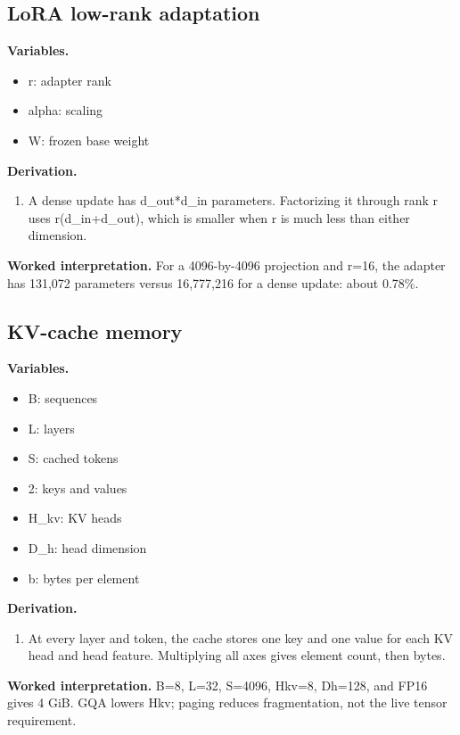 \subsection{LoRA low-rank adaptation}
\textbf{Variables.}\begin{itemize}
\item r: adapter rank
\item alpha: scaling
\item W: frozen base weight
\end{itemize}
\textbf{Derivation.}\begin{derivation}\begin{enumerate}
\item A dense update has d\_out*d\_in parameters. Factorizing it through rank r uses r(d\_in+d\_out), which is smaller when r is much less than either dimension.
\end{enumerate}\end{derivation}
\textbf{Worked interpretation.} For a 4096-by-4096 projection and r=16, the adapter has 131,072 parameters versus 16,777,216 for a dense update: about 0.78\%.
\subsection{KV-cache memory}
\textbf{Variables.}\begin{itemize}
\item B: sequences
\item L: layers
\item S: cached tokens
\item 2: keys and values
\item H\_kv: KV heads
\item D\_h: head dimension
\item b: bytes per element
\end{itemize}
\textbf{Derivation.}\begin{derivation}\begin{enumerate}
\item At every layer and token, the cache stores one key and one value for each KV head and head feature. Multiplying all axes gives element count, then bytes.
\end{enumerate}\end{derivation}
\textbf{Worked interpretation.} B=8, L=32, S=4096, Hkv=8, Dh=128, and FP16 gives 4 GiB. GQA lowers Hkv; paging reduces fragmentation, not the live tensor requirement.
